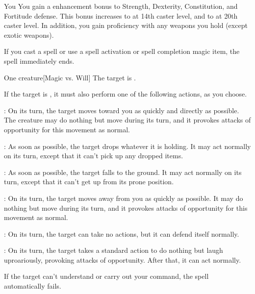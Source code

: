 \spellrng{\rngpers}
\spelldur{\durshort \dismissable}
\begin{spelltarget}{You}
    \spelleffect You gain a  enhancement bonus to Strength, Dexterity, Constitution, and Fortitude defense. This bonus increases to  at 14th caster level, and to  at 20th caster level. In addition, you gain proficiency with any weapons you hold (except exotic weapons).
\end{spelltarget}
\spellnotes If you cast a spell or use a spell activation or spell completion magic item, the spell immediately ends.

\spellrng{\rngmed}
\begin{spelltarget}{One creature}[Magic vs. Will]
    \spellsuccess The target is \bewildered.

    If the target is \bloodied, it must also perform one of the following actions, as you choose.
    \par {}: On its turn, the target moves toward you as quickly and directly as possible. The creature may do nothing but move during its turn, and it provokes attacks of opportunity for this movement as normal.
    \par {}: As soon as possible, the target drops whatever it is holding. It may act normally on its turn, except that it can't pick up any dropped items.
    \par {}: As soon as possible, the target falls to the ground. It may act normally on its turn, except that it can't get up from its prone position.
    \par {}: On its turn, the target moves away from you as quickly as possible. It may do nothing but move during its turn, and it provokes attacks of opportunity for this movement as normal.
    \par {}: On its turn, the target can take no actions, but it can defend itself normally.
    \par {}: On its turn, the target takes a standard action to do nothing but laugh uproariously, provoking attacks of opportunity. After that, it can act normally.
\end{spelltarget}
\spellnotes If the target can't understand or carry out your command, the spell automatically fails.

